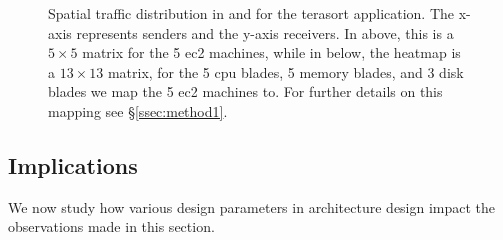 \begin{figure}[t]
  \centering
  \caption{\small{Spatial traffic distribution in \pdis and \dis for the terasort application. The x-axis represents senders and the y-axis receivers. In \pdis above, this is a $5 \times 5$ matrix for the 5 ec2 machines, while in \dis below, the heatmap is a $13 \times 13$ matrix, for the 5 cpu blades, 5 memory blades, and 3 disk blades we map the 5 ec2 machines to. For further details on this mapping see \S\ref{ssec:method1}.}}
  
  \label{fig:sd}
\end{figure}
%
\subsection{Implications}
\label{ssec:knobs}
We now study how various design parameters in \dis architecture design impact the observations made in this section. 




